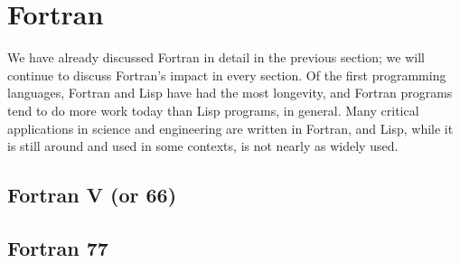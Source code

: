 \section{Fortran}

We have already discussed Fortran in detail in the previous section;
we will continue to discuss Fortran's impact in every section.
Of the first programming languages, Fortran and Lisp have had the
most longevity, and Fortran programs tend to do more work today than
Lisp programs, in general.
Many critical applications in science and engineering are written in Fortran,
and Lisp, while it is still around and used in some contexts, is not
nearly as widely used.

\subsection{Fortran V (or 66)}

\subsection{Fortran 77}
